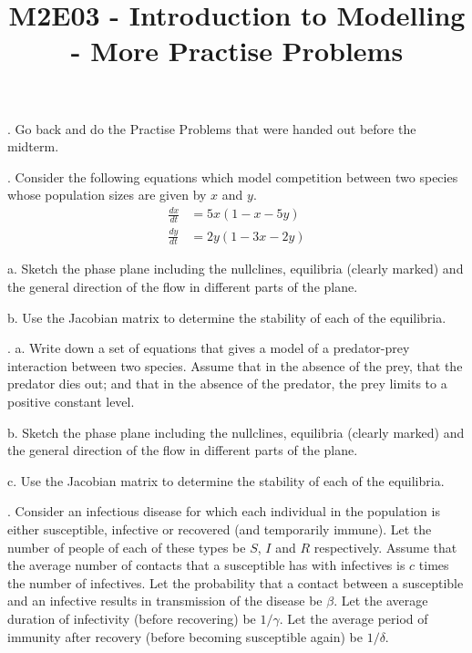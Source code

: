 \documentclass[reqno,12pt]{amsart}
\def \dxdt{\frac{dx}{dt}}
\def \dydt{\frac{dy}{dt}}
\begin{document}
\title{M2E03 - Introduction to Modelling - More Practise Problems}
\maketitle

.  Go back and do the Practise Problems that were handed out
before the midterm.

\vspace{1cm}

.  Consider the following equations which model competition
between two species whose population sizes are given by $x$ and
$y$.
$$
\begin{aligned}
\dxdt &= 5x (1 -  x - 5y)        \\
\dydt &= 2y (1 - 3x - 2y)
\end{aligned}
$$

\noindent
a.  Sketch the phase plane including the nullclines, equilibria
(clearly marked) and the general direction of the flow in different
parts of the plane.

\noindent
b.  Use the Jacobian matrix to determine the stability of each of
the equilibria.


\vspace{1cm}

. a.  Write down a set of equations that gives a model of a predator-prey
interaction between two species.  Assume that in the absence of the prey,
that the predator dies out; and that in the absence of the predator, the
prey limits to a positive constant level.

\noindent
b.  Sketch the phase plane including the nullclines, equilibria
(clearly marked) and the general direction of the flow in different
parts of the plane.

\noindent
c.  Use the Jacobian matrix to determine the stability of each of
the equilibria.

\vspace{1cm}

.  Consider an infectious disease for which each individual in the
population is either susceptible, infective or recovered (and temporarily
immune).  Let the number of people of each of these types be $S$, $I$ and
$R$ respectively.  Assume that the average number of contacts that a
susceptible has with infectives is $c$ times the number of infectives.
Let the probability that a contact between a susceptible and an infective
results in transmission of the disease be $\beta$.  Let the average
duration of infectivity (before recovering) be $1/\gamma$.  Let the
average period of immunity after recovery (before becoming susceptible
again) be $1/\delta$.
\end{document}
